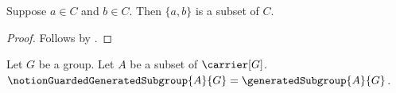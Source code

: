 

\begin{classification}\label{notion_pair_subset_intro}
    Suppose $a\in C$ and $b\in C$.
    Then $\{a,b\}$ is a subset of $C$.
\end{classification}
\begin{proof}
    Follows by .
\end{proof}

\begin{definition}\label{notion_guarded_generated_subgroup}
    Let $G$ be a group.
    Let $A$ be a subset of $\carrier[G]$.
    $\notionGuardedGeneratedSubgroup{A}{G}=
        \generatedSubgroup{A}{G}$.
\end{definition}
